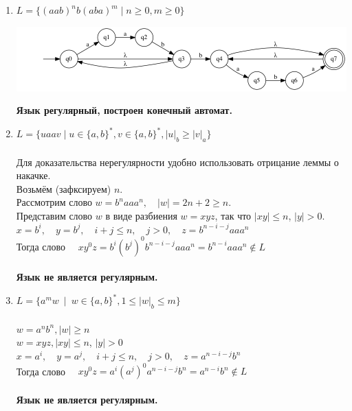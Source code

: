 \documentclass{article}
\begin{document}
\begin{enumerate}
    \item {$ L = \{(a a b)^{n} b(a b a)^{m} \mid n \ge 0, m \ge 0 \}$} \\
        \begin{center}
            \includegraphics[width=1\textwidth]{g41.png}
        \end{center}
        \textbf{Язык регулярный, построен конечный автомат.} \\

    \item {$L = \{{u a a v \mid u \in \{a, b\}^*, v \in \{a, b\}^*, |u|_b \ge |v|_a}\} $}\\ \\
        Для доказательства нерегулярности удобно использовать отрицание леммы о накачке. \\
        Возьмём (зафксируем) $n$. \\
        Рассмотрим слово $w = b^naaa^n, \quad |w| = 2n+2 \geq  n$. \\
        Представим слово $w$ в виде разбиения $w=xyz$, так что $|xy| \leq n$, $|y| > 0$. \\
        $x = b^i, \quad y = b^j,  \quad i+j \leq n, \quad j > 0, \quad z = b^{n-i-j}aaa^n$ \\
        Тогда слово $\quad x y^0 z = b^i (b^j)^0 b^{n-i-j} a a a^n = b^{n-i} a a a^n \notin L$ \\ \\
        \textbf{Язык не является регулярным.} \\
        
   \item {$L = \{ a^mw \ \mid \ w \in \{ a,b \}^*, 1 \leq |w|_b \leq m \}$} \\ \\
        $w = a^n b^n , |w| \geq n$ \\
        $w = xyz, |xy| \leq n$, $|y| > 0$ \\
        $x = a^i, \quad y = a^j, \quad i+j \leq n, \quad j > 0, \quad z = a^{n-i-j}b^n$ \\
        Тогда слово $\quad x y^0 z = a^i (a^j)^0 a^{n-i-j} b^n = a^{n-i} b^n \notin L$ \\ \\
        \textbf{Язык не является регулярным.} \\
        

\end{enumerate}
\end{document}

